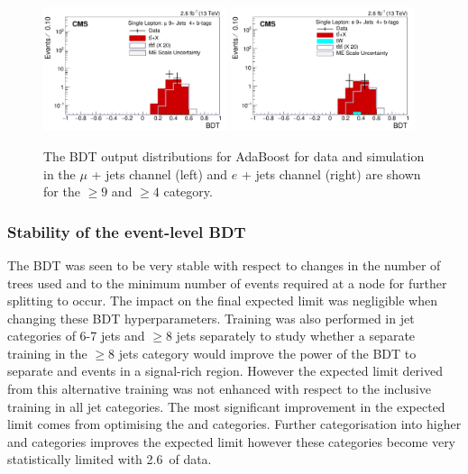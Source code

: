 \begin{figure}[ht!]
    \includegraphics[width=0.48\textwidth]{images/Run2/BDT_Mu29Aug400trees_5MinNodeSize_20nCuts_3MaxDepth_5adaboostbeta_adaBoost_alphaSTune_noMinEvents9nJets4nMtags_StackLogY.pdf}
    \includegraphics[width=0.48\textwidth]{images/Run2/BDT_El29Aug400trees_5MinNodeSize_20nCuts_3MaxDepth_5adaboostbeta_adaBoost_alphaSTune_noMinEvents9nJets4nMtags_StackLogY.pdf}    
    \caption{The BDT output distributions for AdaBoost for data and simulation in the $\mu$ + jets channel (left) and $e$ + jets channel (right) are shown for the $\geq9$ \njets and $\geq4$ \nMtags category.}
    \label{fig:BDT_Mu29Aug400trees_5MinNodeSize_20nCuts_3MaxDepth_5adaboostbeta_adaBoost_alphaSTune_noMinEvents94}
\end{figure}

\subsubsection{Stability of the event-level BDT}

The BDT was seen to be very stable with respect to changes in the number of trees used and to the minimum number of events required at a node for further splitting to occur. The impact on the final expected limit was negligible when changing these BDT hyperparameters. Training was also performed in jet categories of 6-7 jets and $\geq$8 jets separately to study whether a separate training in the $\geq8$ jets category would improve the power of the BDT to separate \ttbar and \tttt events in a signal-rich region. However the expected limit derived from this alternative training was not enhanced with respect to the inclusive training in all jet categories. The most significant improvement in the expected limit comes from optimising the \njets and \nMtags categories. Further categorisation into higher \njets and \nMtags categories improves the expected limit however these categories become very statistically limited with 2.6~\fbinv of data.

